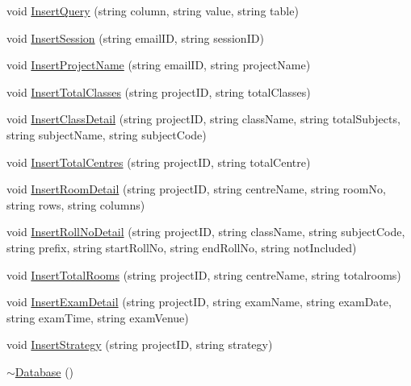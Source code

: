 \begin{DoxyCompactItemize}
\item 
void \hyperlink{classDatabase_a513326ea43b2455177731fbc92c4bf4f}{Insert\-Query} (string column, string value, string table)
\item 
void \hyperlink{classDatabase_a478f862bd338a92b13c2899bb4e28843}{Insert\-Session} (string email\-I\-D, string session\-I\-D)
\item 
void \hyperlink{classDatabase_aae19d9dac16779519f94cc68e29cb57d}{Insert\-Project\-Name} (string email\-I\-D, string project\-Name)
\item 
void \hyperlink{classDatabase_ad6af2dc859cda41dcbdad9cd51f5c38b}{Insert\-Total\-Classes} (string project\-I\-D, string total\-Classes)
\item 
void \hyperlink{classDatabase_a45deae7ea496fccefb9bccd75ea5578a}{Insert\-Class\-Detail} (string project\-I\-D, string class\-Name, string total\-Subjects, string subject\-Name, string subject\-Code)
\item 
void \hyperlink{classDatabase_a8e52c1b853b6f1d96cf7053f0268838d}{Insert\-Total\-Centres} (string project\-I\-D, string total\-Centre)
\item 
void \hyperlink{classDatabase_a8b248d14e1cb2fc4ba2c9da313f385cb}{Insert\-Room\-Detail} (string project\-I\-D, string centre\-Name, string room\-No, string rows, string columns)
\item 
void \hyperlink{classDatabase_aa33ead23a5fff6e369c739cac4e911a4}{Insert\-Roll\-No\-Detail} (string project\-I\-D, string class\-Name, string subject\-Code, string prefix, string start\-Roll\-No, string end\-Roll\-No, string not\-Included)
\item 
void \hyperlink{classDatabase_a6cd1b1181fb636aff93ba43f0fcd2764}{Insert\-Total\-Rooms} (string project\-I\-D, string centre\-Name, string totalrooms)
\item 
void \hyperlink{classDatabase_a0a1ec932aafeef96637d5ee68ac7898b}{Insert\-Exam\-Detail} (string project\-I\-D, string exam\-Name, string exam\-Date, string exam\-Time, string exam\-Venue)
\item 
void \hyperlink{classDatabase_a6015ae56eb561f579e573be709ef434c}{Insert\-Strategy} (string project\-I\-D, string strategy)
\item 
\hyperlink{classDatabase_a84d399a2ad58d69daab9b05330e1316d}{$\sim$\-Database} ()
\end{DoxyCompactItemize}
